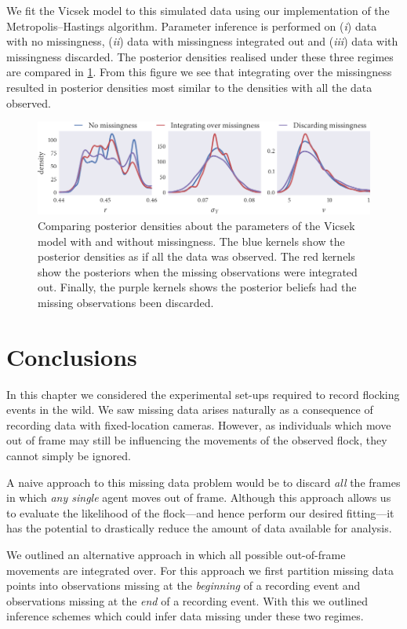 We fit the Vicsek model to this simulated data using our implementation of the
Metropolis--Hastings algorithm. Parameter inference is performed on (\emph{i})
data with no missingness, (\emph{ii}) data with missingness integrated out and
(\emph{iii}) data with missingness discarded. The posterior densities realised
under these three regimes are compared in \cref{fig:both_compare}. From this
figure we see that integrating over the missingness resulted in posterior
densities most similar to the densities with all the data observed.

\begin{figure}[tbp]
  \includegraphics{both/compare_params.pdf}
  \caption{Comparing posterior densities about the parameters of the Vicsek
  model with and without missingness. The blue kernels show the posterior
  densities as if all the data was observed. The red kernels show the
  posteriors when the missing observations were integrated out. Finally, the
  purple kernels shows the posterior beliefs had the missing observations been
  discarded.}
  \label{fig:both_compare}
\end{figure}

\section*{Conclusions}

In this chapter we considered the experimental set-ups required to record
flocking events in the wild. We saw missing data arises naturally as a
consequence of recording data with fixed-location cameras. However, as
individuals which move out of frame may still be influencing the movements
of the observed flock, they cannot simply be ignored.

A naive approach to this missing data problem would be to discard \emph{all}
the frames in which \emph{any single} agent moves out of frame. Although this
approach allows us to evaluate the likelihood of the flock---and hence perform
our desired fitting---it has the potential to drastically reduce the amount of
data available for analysis.

We outlined an alternative approach in which all possible out-of-frame
movements are integrated over. For this approach we first partition missing
data points into observations missing at the \emph{beginning} of a recording
event and observations missing at the \emph{end} of a recording event. With this
we outlined inference schemes which could infer data missing under these two
regimes.

